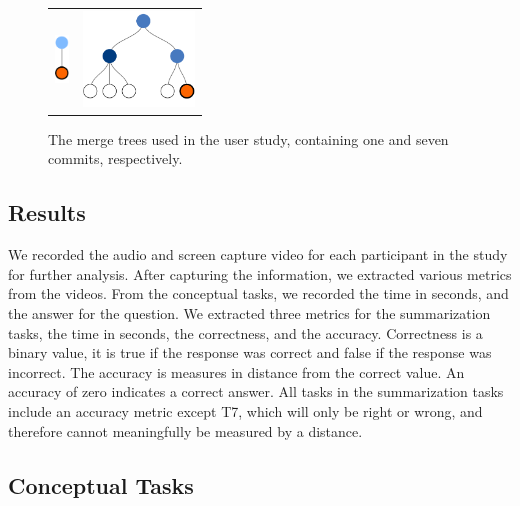 \documentclass[draft]{IEEEtran}
\begin{document}
\begin{figure}[bpt]
  \centering
\begin{tabular}{ m{1.5cm} m{3cm} }
  \includegraphics[height=0.5in]{figures/commits/1-commit.pdf} &
  \includegraphics[height=1in]{figures/commits/7-commits.pdf}\\
\end{tabular}
  \caption{The merge trees used in the user study, 
    containing one and seven commits, respectively.}
  \label{fig:commit_1}
\end{figure}


\subsection{Results}
\label{sec:results}


We recorded the audio and screen capture video for each participant in
the study for further analysis.
After capturing the information, we
extracted various metrics from the videos.
From the conceptual tasks, we
recorded the time in seconds, and the answer for the question. We
extracted three metrics for the summarization tasks, the time in
seconds, the correctness, and the accuracy.
Correctness is a binary
value, it is true if the response was correct and false if the response
was incorrect.
The accuracy is measures in distance from the correct
value. An accuracy of zero indicates a correct answer. All tasks in the
summarization tasks include an accuracy metric except T7, which will
only be right or wrong, and therefore cannot meaningfully be measured by
a distance.

\subsection{Conceptual Tasks}
\label{sub:conceptual_tasks}
\end{document}
